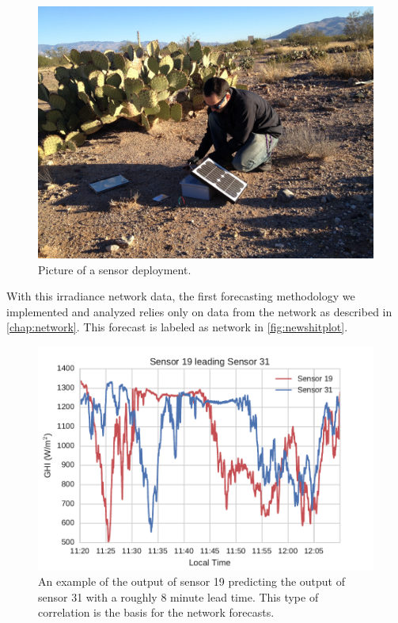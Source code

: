 \begin{figure}[htbp]
\includegraphics[width=\textwidth]{figs/sensdeploy.jpg}
\caption{Picture of a sensor deployment.}
\end{figure}

With this irradiance network data, the first forecasting methodology
we implemented and analyzed relies only on data from the network as
described in \cref{chap:network}.
This forecast is labeled as network in \cref{fig:newshitplot}.

\begin{figure}[htbp]
\includegraphics[width=\textwidth]{figs/leading_sens.pdf}
\caption[One sensor predicting the output of another]{An example of
  the output of sensor 19 predicting the output of sensor 31 with a
  roughly 8 minute lead time. This type of correlation is the basis
  for the network forecasts.}
\label{fig:19leading31}
\end{figure}

